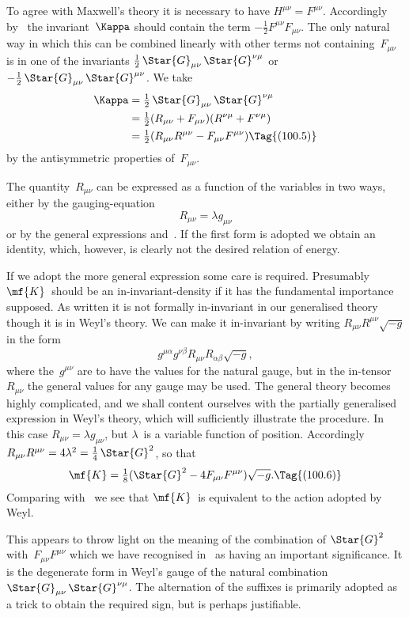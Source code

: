 \documentclass[12pt]{book}
\begin{document}
To agree with Maxwell's theory it is necessary to have $H^{\mu\nu} = F^{\mu\nu}$. Accordingly
by~ the invariant~$\Kappa$ should contain the term $-\frac{1}{2}F^{\mu\nu} F_{\mu\nu}$.
The only natural way in which this can be combined linearly with other
terms not containing~$F_{\mu\nu}$ is in one of the invariants $\frac{1}{2}\, \Star{G}_{\mu\nu}\, \Star{G}^{\nu\mu}$ or  $-\frac{1}{2}\, \Star{G}_{\mu\nu}\, \Star{G}^{\mu\nu}$.
We take
\begin{align*}
\Kappa &= \tfrac{1}{2}\, \Star{G}_{\mu\nu}\, \Star{G}^{\nu\mu} \\
&= \tfrac{1}{2} (R_{\mu\nu} + F_{\mu\nu})(R^{\nu\mu} + F^{\nu\mu}) \\
&= \tfrac{1}{2} (R_{\mu\nu} R^{\mu\nu} - F_{\mu\nu} F^{\mu\nu})
\Tag{(100.5)}
\end{align*}
by the antisymmetric properties of~$F_{\mu\nu}$.

The quantity~$R_{\mu\nu}$ can be expressed as a function of the variables in two
ways, either by the gauging\hyp{}equation
\[
R_{\mu\nu} = \lambda g_{\mu\nu}
\]
or by the general expressions  and~. If the first form is adopted
we obtain an identity, which, however, is clearly not the desired relation of
energy.

If we adopt the more general expression some care is required. Presumably
$\mf{K}$~should be an in\hyp{}invariant\hyp{}density if it has the fundamental
importance supposed. As written it is not formally in\hyp{}invariant in our
generalised theory though it is in Weyl's theory. We can make it in\hyp{}invariant
by writing $R_{\mu\nu} R^{\mu\nu} \sqrt{-g}$ in the form
\[
g^{\mu\alpha} g^{\nu\beta} R_{\mu\nu} R_{\alpha\beta} \sqrt{-g},
\]
where the~$g^{\mu\nu}$ are to have the values for the natural gauge, but in the in\hyp{}tensor~$R_{\mu\nu}$
the general values for any gauge may be used. The general theory
becomes highly complicated, and we shall content ourselves with the partially
generalised expression in Weyl's theory, which will sufficiently illustrate the
procedure. In this case $R_{\mu\nu} = \lambda g_{\mu\nu}$, but $\lambda$~is a variable function of position.
Accordingly $R_{\mu\nu} R^{\mu\nu} = 4\lambda^2 = \frac{1}{4}\, \Star{G}^{2}$, so that
\[
\mf{K} = \tfrac{1}{8}(\Star{G}^{2} - 4F_{\mu\nu} F^{\mu\nu}) \sqrt{-g}.
\Tag{(100.6)}
\]
Comparing with~ we see that $\mf{K}$~is equivalent to the action adopted by
%
Weyl.

This appears to throw light on the meaning of the combination of $\Star{G}^{2}$
with~$F_{\mu\nu} F^{\mu\nu}$ which we have recognised in~ as having an important
significance. It is the degenerate form in Weyl's gauge of the natural combination
$\Star{G}_{\mu\nu}\, \Star{G}^{\nu\mu}$. The alternation of the suffixes is primarily adopted as a
trick to obtain the required sign, but is perhaps justifiable.
\end{document}
